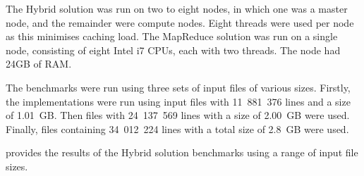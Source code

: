 \documentclass[12pt,twocolumn]{witseiepaper}
\begin{document}
The Hybrid solution was run on two to eight nodes, in which one was a master node, and the remainder were compute nodes. Eight threads were used per node as this minimises caching load. The MapReduce solution was run on a single node, consisting of eight Intel i7 CPUs, each with two threads. The node had 24GB of RAM.

The benchmarks were run using three sets of input files of various sizes. Firstly, the implementations were run using input files with 11~881~376 lines and a size of 1.01~GB. Then files with 24~137~569 lines with a size of 2.00~GB were used. Finally, files containing 34~012~224 lines with a total size of 2.8~GB were used. 

 provides the results of the Hybrid solution benchmarks using a range of input file sizes.

\begin{table}[!htbp]
	\caption{Comparison of time taken (in seconds) to compute the equi-join using the Hybrid solution with various input files over scaled numbers of nodes}
	\centering
	\label{tab:results1}
\end{table}

\begin{table}[!htbp]
	\centering
	\caption{Comparison of time taken (in seconds) to compute the equi-join using MapReduce with different input files sizes over various numbers of threads}
	\label{tab:mapreduceresults}
\end{table}
\end{document}

